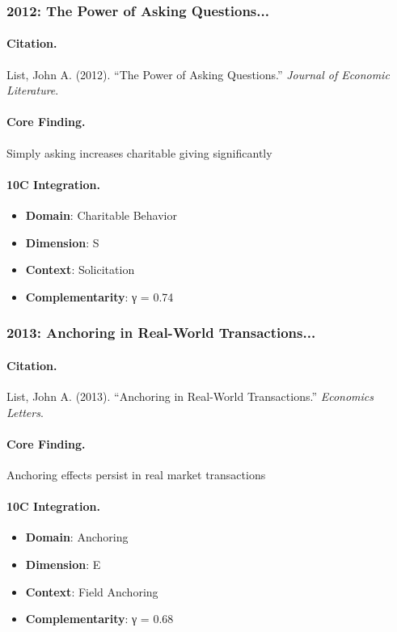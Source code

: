 \subsubsection{2012: The Power of Asking Questions...}

\paragraph{Citation.}
List, John A. (2012). ``The Power of Asking Questions.''
\textit{Journal of Economic Literature}.

\paragraph{Core Finding.}
Simply asking increases charitable giving significantly

\paragraph{10C Integration.}
\begin{itemize}[nosep]
  \item \textbf{Domain}: Charitable Behavior
  \item \textbf{Dimension}: S
  \item \textbf{Context}: Solicitation
  \item \textbf{Complementarity}: γ = 0.74
\end{itemize}


\subsubsection{2013: Anchoring in Real-World Transactions...}

\paragraph{Citation.}
List, John A. (2013). ``Anchoring in Real-World Transactions.''
\textit{Economics Letters}.

\paragraph{Core Finding.}
Anchoring effects persist in real market transactions

\paragraph{10C Integration.}
\begin{itemize}[nosep]
  \item \textbf{Domain}: Anchoring
  \item \textbf{Dimension}: E
  \item \textbf{Context}: Field Anchoring
  \item \textbf{Complementarity}: γ = 0.68
\end{itemize}


